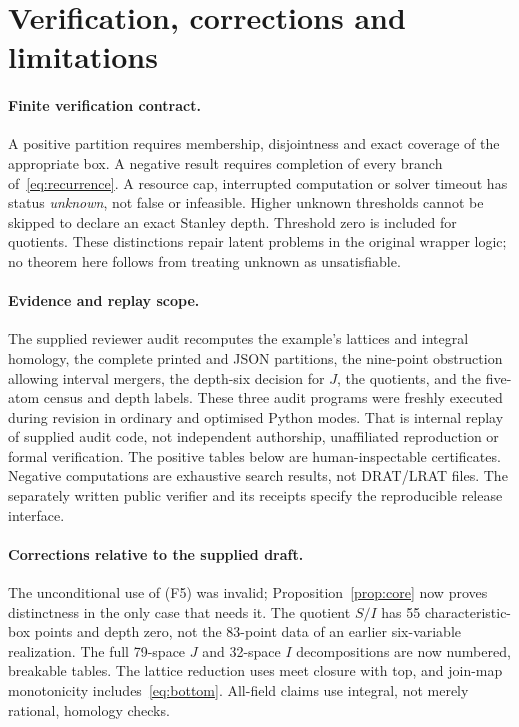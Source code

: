 \documentclass[11pt,a4paper]{article}
\theoremstyle{remark}\newtheorem{remark}[theorem]{Remark}
\begin{document}
\section{Verification, corrections and limitations}\label{sec:verification}
\paragraph{Finite verification contract.}
A positive partition requires membership, disjointness and exact coverage of the appropriate box. A negative result requires completion of every branch of~\eqref{eq:recurrence}. A resource cap, interrupted computation or solver timeout has status \emph{unknown}, not false or infeasible. Higher unknown thresholds cannot be skipped to declare an exact Stanley depth. Threshold zero is included for quotients. These distinctions repair latent problems in the original wrapper logic; no theorem here follows from treating unknown as unsatisfiable.

\paragraph{Evidence and replay scope.}
The supplied reviewer audit recomputes the example's lattices and integral homology, the complete printed and JSON partitions, the nine-point obstruction allowing interval mergers, the depth-six decision for $J$, the quotients, and the five-atom census and depth labels. These three audit programs were freshly executed during revision in ordinary and optimised Python modes. That is internal replay of supplied audit code, not independent authorship, unaffiliated reproduction or formal verification. The positive tables below are human-inspectable certificates. Negative computations are exhaustive search results, not DRAT/LRAT files. The separately written public verifier and its receipts specify the reproducible release interface.

\paragraph{Corrections relative to the supplied draft.}
The unconditional use of (F5) was invalid; Proposition~\ref{prop:core} now proves distinctness in the only case that needs it. The quotient $S/I$ has 55 characteristic-box points and depth zero, not the 83-point data of an earlier six-variable realization. The full 79-space $J$ and 32-space $I$ decompositions are now numbered, breakable tables. The lattice reduction uses meet closure with top, and join-map monotonicity includes~\eqref{eq:bottom}. All-field claims use integral, not merely rational, homology checks.
\end{document}
